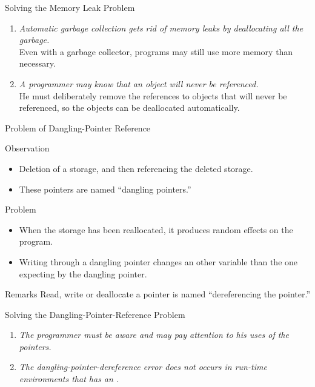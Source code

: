 \begin{bibunit}[apalike]
\begin{frame}{Solving the Memory Leak Problem}
	\begin{enumerate}
	\item \emph{Automatic garbage collection gets rid of memory leaks by deallocating all the garbage.}\\
		Even with a garbage collector, programs may still use more memory than necessary.
	\vfill
	\item \emph{A programmer may know that an object will never be referenced.} \\
		He must deliberately remove the references to objects that will never be referenced, so the objects can be deallocated automatically.
	\end{enumerate}
\end{frame}

\begin{frame}{Problem of Dangling-Pointer Reference}
	\begin{small}
	\begin{block}{\small Observation}
		\begin{itemize}
		\item Deletion of a storage, and then referencing the deleted storage.
		\item These pointers are named ``dangling pointers.''
		\end{itemize}
	\end{block}
	\begin{alertblock}{\small Problem}
		\begin{itemize}
		\item When the storage has been reallocated, it produces random effects on the program.
		\item Writing through a dangling pointer changes an other variable than the one expecting by the dangling pointer.
		\end{itemize}
	\end{alertblock}
	\begin{block}{\small Remarks}
		Read, write or deallocate a pointer is named ``dereferencing the pointer.''
	\end{block}
	\end{small}
\end{frame}

\begin{frame}{Solving the Dangling-Pointer-Reference Problem}
	\begin{enumerate}
	\item \emph{The programmer must be aware and may pay attention to his uses of the pointers.}
	\vfill
	\item \emph{The dangling-pointer-dereference error does not occurs in run-time environments that has an .}
	\end{enumerate}
\end{frame}


\end{bibunit}
